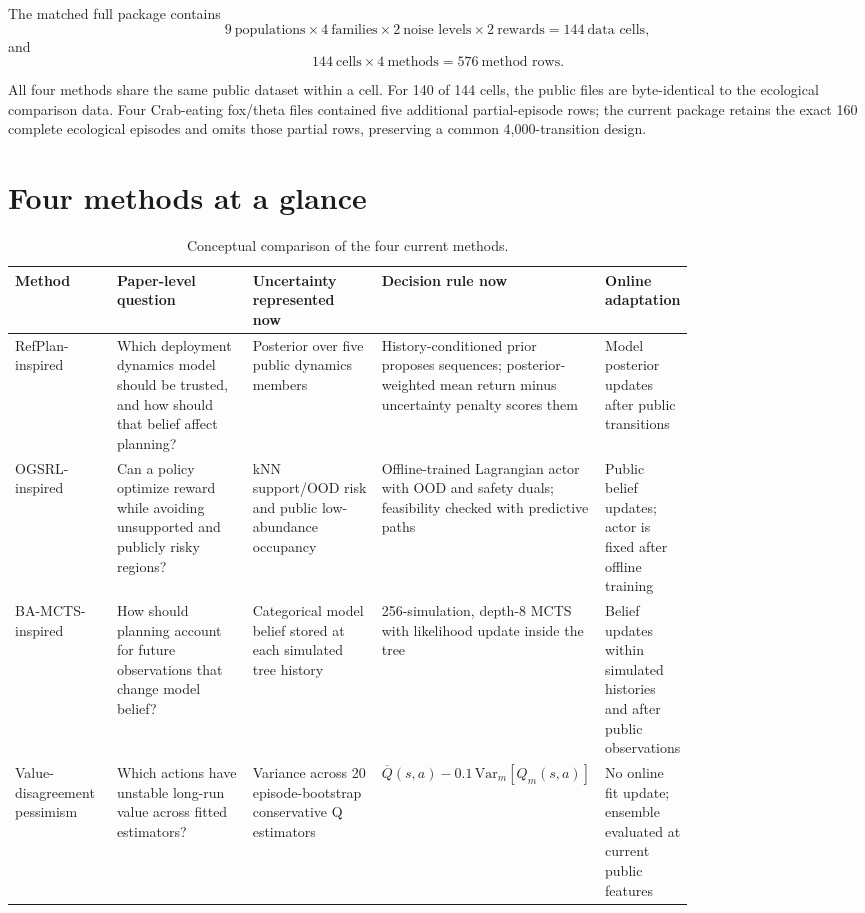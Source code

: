 \documentclass[11pt,a4paper]{article}
\begin{document}
The matched full package contains
\[
9\ \text{populations}\times 4\ \text{families}\times 2\ \text{noise levels}
\times 2\ \text{rewards}=144\ \text{data cells},
\]
and
\[
144\ \text{cells}\times 4\ \text{methods}=576\ \text{method rows}.
\]

All four methods share the same public dataset within a cell. For 140 of 144 cells, the public
files are byte-identical to the ecological comparison data. Four Crab-eating fox/theta files
contained five additional partial-episode rows; the current package retains the exact 160 complete
ecological episodes and omits those partial rows, preserving a common 4,000-transition design.

\section{Four methods at a glance}

\begin{landscape}
\begin{table}[p]
\centering
\small
\caption{Conceptual comparison of the four current methods.}
\begin{tabularx}{\linewidth}{P{0.15\linewidth}P{0.20\linewidth}P{0.19\linewidth}P{0.25\linewidth}Y}
\toprule
Method & Paper-level question & Uncertainty represented now & Decision rule now & Online adaptation \\
\midrule
RefPlan-inspired & Which deployment dynamics model should be trusted, and how should that belief affect planning? & Posterior over five public dynamics members & History-conditioned prior proposes sequences; posterior-weighted mean return minus uncertainty penalty scores them & Model posterior updates after public transitions \\
\addlinespace
OGSRL-inspired & Can a policy optimize reward while avoiding unsupported and publicly risky regions? & kNN support/OOD risk and public low-abundance occupancy & Offline-trained Lagrangian actor with OOD and safety duals; feasibility checked with predictive paths & Public belief updates; actor is fixed after offline training \\
\addlinespace
BA-MCTS-inspired & How should planning account for future observations that change model belief? & Categorical model belief stored at each simulated tree history & 256-simulation, depth-8 MCTS with likelihood update inside the tree & Belief updates within simulated histories and after public observations \\
\addlinespace
Value-disagreement pessimism & Which actions have unstable long-run value across fitted estimators? & Variance across 20 episode-bootstrap conservative Q estimators & $\overline Q(s,a)-0.1\,\mathrm{Var}_m[Q_m(s,a)]$ & No online fit update; ensemble evaluated at current public features \\
\bottomrule
\end{tabularx}
\end{table}
\end{landscape}
\end{document}
